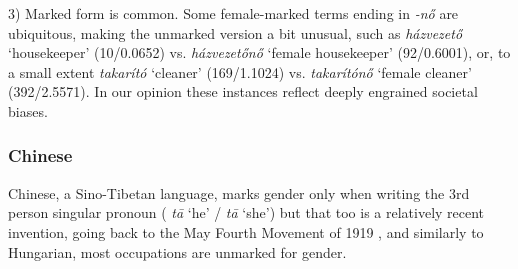 \documentclass[10pt, a4paper]{article}
\newcommand{\zh}[1]{\simplifiedchinesefont{#1}\rmfamily}
\begin{document}
3) Marked form is common. Some female-marked terms ending in \textit{-nő} are ubiquitous, making the unmarked version a bit unusual, such as \textit{házvezető} `housekeeper' (10/0.0652) vs. \textit{házvezetőnő} `female housekeeper' (92/0.6001), or, to a small extent \textit{takarító} `cleaner' (169/1.1024) vs. \textit{takarítónő} `female cleaner' (392/2.5571). In our opinion these instances reflect deeply engrained societal biases.

\subsubsection{Chinese}

Chinese, a Sino-Tibetan language, marks gender only when writing the 3rd person singular pronoun (\zh{他} \textit{tā} `he' / \zh{她} \textit{tā} `she') but that too is a relatively recent invention, going back to the May Fourth Movement of 1919 \citep{bi_2013_tazi}, and similarly to Hungarian, most occupations are unmarked for gender.

\end{document}
